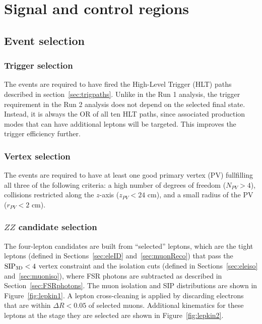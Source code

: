 \chapter{Signal and control regions}

\section{Event selection}

\subsection{Trigger selection}
\label{sec:HLTsel}

The events are required to have fired the High-Level Trigger (HLT) paths described in section~\ref{sec:trigpaths}. Unlike in the Run 1 analysis, the trigger requirement in the Run 2 analysis does not depend on the selected final state. Instead, it is always the OR of all ten HLT paths, since associated production modes that can have additional leptons will be targeted. This improves the trigger efficiency further.

\subsection{Vertex selection}
\label{sec:vertexsel}

The events are required to have at least one good primary
vertex (PV) fullfilling all three of the following criteria: a high number of degrees
of freedom ($N_{PV}>4$), collisions restricted along the $z$-axis
($z_{PV}<24$ cm), and a small radius of the PV ($r_{PV}<2$ cm).


\subsection{$ZZ$ candidate selection}
\label{sec:zzcandsel}

The four-lepton candidates are built from ``selected'' leptons, which  
are the tight leptons (defined in Sections~\ref{sec:eleID} and~\ref{sec:muonReco}) that pass the ${\rm SIP_{3D}} < 4$ vertex constraint
and the isolation cuts (defined in Sections~\ref{sec:eleiso} and~\ref{sec:muoniso}), 
where FSR photons are subtracted as described in Section~\ref{sec:FSRphotons}. The muon isolation and SIP distributions are shown in Figure~\ref{fig:lepkin1}.
A lepton cross-cleaning is applied 
by discarding electrons that are within $\Delta R < 0.05$ of selected muons. Additional kinematics for these leptons at the stage they are selected are shown in Figure~\ref{fig:lepkin2}.

